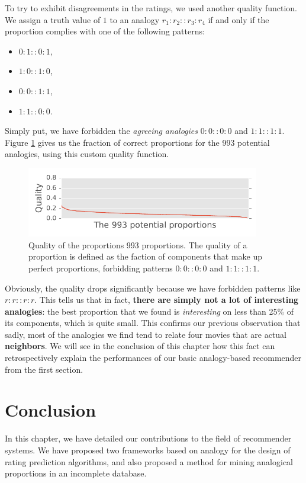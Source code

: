 To try to exhibit disagreements in the ratings, we used another quality
function. We assign a truth value of $1$ to an analogy $r_1:r_2::r_3:r_4$ if
and only if the proportion complies with one of the following patterns:
\begin{itemize}
  \item $0:1::0:1$,
  \item $1:0::1:0$,
  \item $0:0::1:1$,
  \item $1:1::0:0$.
\end{itemize}
Simply put, we have forbidden the \textit{agreeing analogies} $0:0::0:0$ and
$1:1::1:1$. Figure \ref{FIG:quality_proportions_different_ab_cd} gives us the
fraction of correct proportions for the 993 potential analogies, using this
custom quality function.
\begin{figure}[!h]
\centering
  \includegraphics[width=4in]{figures/quality_of_proportions_different.pdf}
  \caption{Quality of the proportions 993 proportions. The quality of a
  proportion is defined as the faction of components that make up perfect
  proportions, forbidding patterns $0:0::0:0$ and $1:1::1:1$.}
\label{FIG:quality_proportions_different_ab_cd}
\end{figure}
Obviously, the quality drops significantly because we have forbidden patterns
like $r:r::r:r$. This tells us that in fact, \textbf{there are simply not a lot of
interesting analogies}: the best proportion that we found is
\textit{interesting} on less than 25\% of its components, which is quite small.
This confirms our previous observation that sadly, most of the analogies we
find tend to relate four movies that are actual \textbf{neighbors}. We will see
in the conclusion of this chapter how this fact can retrospectively explain the
performances of our basic analogy-based recommender from the first section.

\section{Conclusion}

In this chapter, we have detailed our contributions to the field of recommender
systems. We have proposed two frameworks based on analogy for the design of
rating prediction algorithms, and also proposed a method for mining analogical
proportions in an incomplete database.

